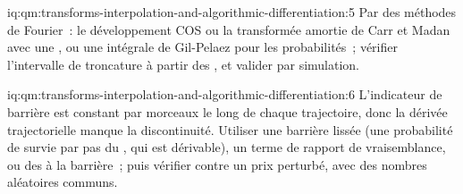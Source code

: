 \begin{solution}{iq:qm:transforms-interpolation-and-algorithmic-differentiation:5}
Par des méthodes de Fourier~: le développement COS ou la transformée amortie de Carr et Madan avec une , ou une intégrale de Gil-Pelaez pour les probabilités~; vérifier l'intervalle de troncature à partir des , et
valider par simulation.
\end{solution}

\begin{solution}{iq:qm:transforms-interpolation-and-algorithmic-differentiation:6}
L'indicateur de barrière est constant par morceaux le long de chaque trajectoire, donc la dérivée trajectorielle manque la discontinuité. Utiliser une barrière lissée (une probabilité de survie par pas du , qui est
dérivable), un terme de rapport de vraisemblance, ou des  à la barrière~; puis vérifier contre un prix perturbé, avec des nombres aléatoires communs.
\end{solution}
